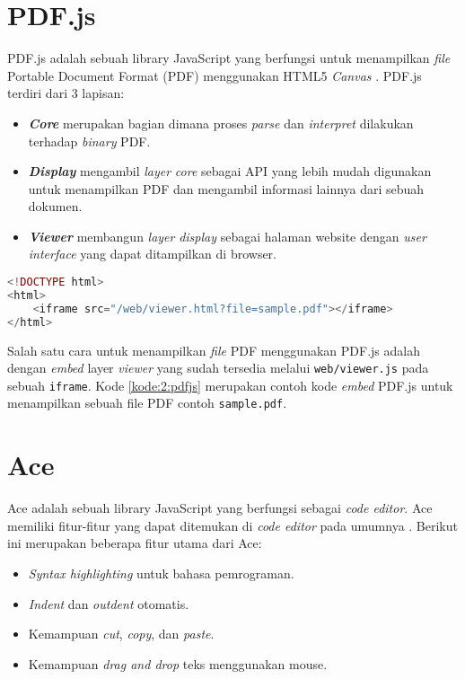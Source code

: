 \section{PDF.js}
\label{sec:2:pdfjs} 
PDF.js adalah sebuah library JavaScript yang berfungsi untuk menampilkan \textit{file} Portable Document Format (PDF) menggunakan HTML5 \textit{Canvas} \cite{pdfjs}. PDF.js terdiri dari 3 lapisan:

\begin{itemize}
	\item \textit{\textbf{Core}} merupakan bagian dimana proses \textit{parse} dan \textit{interpret} dilakukan terhadap \textit{binary} PDF.
	\item \textit{\textbf{Display}} mengambil \textit{layer} \textit{core} sebagai API yang lebih mudah digunakan untuk menampilkan PDF dan mengambil informasi lainnya dari sebuah dokumen.
	\item \textit{\textbf{Viewer}} membangun \textit{layer} \textit{display} sebagai halaman website dengan \textit{user interface} yang dapat ditampilkan di browser.
\end{itemize}

\begin{lstlisting}[language=php, caption=Contoh kode untuk menggunakan PDF.js, label=kode:2:pdfjs]
<!DOCTYPE html>
<html>
    <iframe src="/web/viewer.html?file=sample.pdf"></iframe>
</html>
\end{lstlisting}

Salah satu cara untuk menampilkan \textit{file} PDF menggunakan PDF.js adalah dengan \textit{embed} layer \textit{viewer} yang sudah tersedia melalui \verb|web/viewer.js| pada sebuah \verb|iframe|. Kode \ref{kode:2:pdfjs} merupakan contoh kode \textit{embed} PDF.js untuk menampilkan sebuah file PDF contoh \verb|sample.pdf|.

\section{Ace}
\label{sec:2:ace} 
Ace adalah sebuah library JavaScript yang berfungsi sebagai \textit{code editor}.
Ace memiliki fitur-fitur yang dapat ditemukan di \textit{code editor} pada umumnya \cite{ace}. Berikut ini merupakan beberapa fitur utama dari Ace: 

\begin{itemize}
    \item \textit{Syntax highlighting} untuk bahasa pemrograman.
    \item \textit{Indent} dan \textit{outdent} otomatis.
    \item Kemampuan \textit{cut}, \textit{copy}, dan \textit{paste}.
    \item Kemampuan \textit{drag and drop} teks menggunakan mouse.
\end{itemize}

